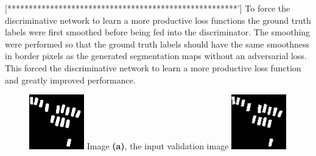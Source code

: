 \documentclass[a4paper,11pt]{article}
\begin{document}
[******************************************************']
To force the discriminative network to learn a more productive loss functions the ground truth labels were first smoothed before being fed into the discriminator. The smoothing were performed so that the ground truth labels should have the same smoothness in border pixels as the generated segmentation maps without an adversarial loss. This forced the discriminative network to learn a more productive loss function and greatly improved performance.
\begin{figure}[H]
  \includegraphics[width=\linewidth]{pred_soft}
  Image \textbf{(a)}, the input validation image
\endminipage\hfill
{}
  \includegraphics[width=\linewidth]{label_blured}

\end{figure}
\end{document}
